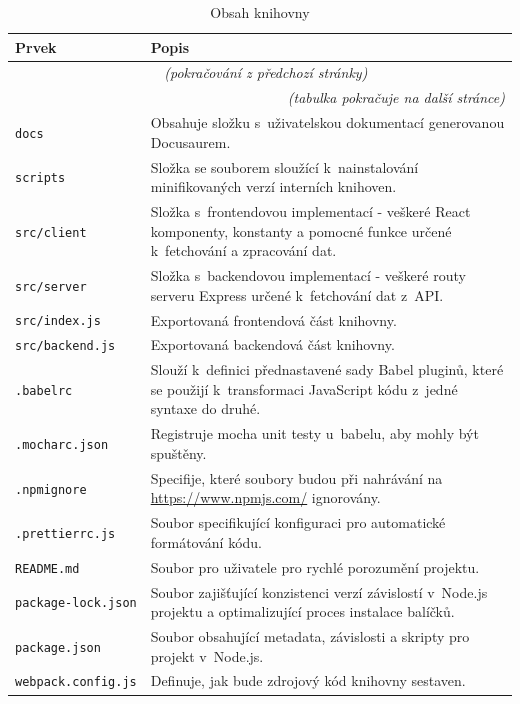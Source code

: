 \documentclass[czech, bc, kiv, he, iso690numb]{fasthesis}
\begin{document}
	\begin{longtable}{p{}p{}}
	\caption{Obsah knihovny}
	\label{tab:dirLibrary}\\
	\toprule[1.5pt]
	\textbf{Prvek} & \textbf{Popis}\\
	\midrule
	\endfirsthead
	\multicolumn{2}{c}{\tablename{}~\thetable{} \textit{(pokračování z předchozí stránky)}}\\
	\endhead
	\midrule
	\multicolumn{2}{r}{\textit{(tabulka pokračuje na další stránce)}}\\
	\endfoot
	\bottomrule[1.5pt]
	\endlastfoot
	\verb"docs" & Obsahuje složku s~uživatelskou dokumentací generovanou Docusaurem. \\
	\midrule
	\verb"scripts" & Složka se souborem sloužící k~nainstalování minifikovaných verzí interních knihoven. \\
	\midrule
	\verb"src/client" & Složka s~frontendovou implementací - veškeré React komponenty, konstanty a pomocné funkce určené k~fetchování a zpracování dat.  \\
	\midrule
	\verb"src/server" & Složka s~backendovou implementací - veškeré routy serveru Express určené k~fetchování dat z~API.  \\
	\midrule
	\verb"src/index.js" & Exportovaná frontendová část knihovny. \\
	\midrule
	\verb"src/backend.js" & Exportovaná backendová část knihovny. \\
	\midrule
	\verb".babelrc" & Slouží k~definici přednastavené sady Babel pluginů, které se použijí k~transformaci JavaScript kódu z~jedné syntaxe do druhé.  \\
	\midrule
	\verb".mocharc.json" & Registruje mocha unit testy u~babelu, aby mohly být spuštěny.  \\
	\midrule
	\verb".npmignore" & Specifije, které soubory budou při nahrávání na \url{https://www.npmjs.com/} ignorovány. \\
	\midrule
	\verb".prettierrc.js" & Soubor specifikující konfiguraci pro automatické formátování kódu. \\
	\midrule
	\verb"README.md" & Soubor pro uživatele pro rychlé porozumění projektu.  \\
	\midrule
	\verb"package-lock.json" & Soubor zajišťující konzistenci verzí závislostí v~Node.js projektu a optimalizující proces instalace balíčků.  \\
	\midrule
	\verb"package.json" & Soubor obsahující metadata, závislosti a skripty pro projekt v~Node.js. \\
	\midrule
	\verb"webpack.config.js" & Definuje, jak bude zdrojový kód knihovny sestaven.  \\
	\end{longtable}
\end{document}
